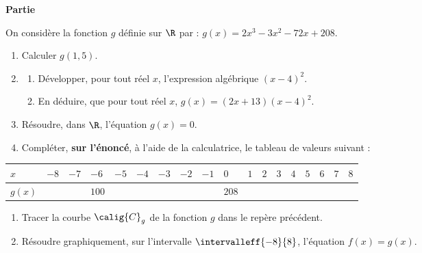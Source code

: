 \documentclass[10pt,french]{article}
\begin{document}
\medskip\textbf{Partie} 

On considère la fonction $g$ définie sur $\R$ par : $g(x)=2x^3-3x^2-72x+208$.

\begin{enumerate}[label=\arabic*.]
\item Calculer $g(1,5)$.

\item 	\begin{enumerate}[label=\alph*)]
	\item Développer, pour tout réel $x$, l'expression algébrique $(x-4)^2$.
	
	\item En déduire, que pour tout réel $x$, $g(x)=(2x+13)(x-4)^2$.
	
	\end{enumerate}

\item Résoudre, dans $\R$, l'équation $g(x)=0$.

\item Compléter, \textbf{sur l'énoncé}, à l'aide de la calculatrice, le tableau de valeurs suivant :

\end{enumerate}

\small
\begin{tabular}{|*{18}{M{0.5cm}|}}
\hline
$x$&$-8$&$-7$&$-6$&$-5$&$-4$&$-3$&$-2$&$-1$&$0$&$1$&$2$&$3$&$4$&$5$&$6$&$7$&$8$\\
\hline
$g(x)$& & &$100$& & & & & &$208$& & & & & & & & \\
\hline
\end{tabular}
\normalsize

\begin{enumerate}[resume,label=\arabic*.]
\item Tracer la courbe $\calig{C}_g$ de la fonction $g$ dans le repère précédent.

\item Résoudre graphiquement, sur l'intervalle $\intervalleff{-8}{8}$, l'équation $f(x)=g(x)$.

\end{enumerate}
\end{document}
